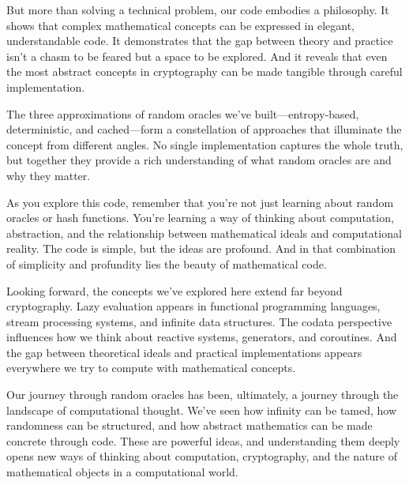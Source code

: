 \documentclass[11pt]{article}
\begin{document}
But more than solving a technical problem, our code embodies a philosophy. It shows that complex mathematical concepts can be expressed in elegant, understandable code. It demonstrates that the gap between theory and practice isn't a chasm to be feared but a space to be explored. And it reveals that even the most abstract concepts in cryptography can be made tangible through careful implementation.

The three approximations of random oracles we've built---entropy-based, deterministic, and cached---form a constellation of approaches that illuminate the concept from different angles. No single implementation captures the whole truth, but together they provide a rich understanding of what random oracles are and why they matter.

As you explore this code, remember that you're not just learning about random oracles or hash functions. You're learning a way of thinking about computation, abstraction, and the relationship between mathematical ideals and computational reality. The code is simple, but the ideas are profound. And in that combination of simplicity and profundity lies the beauty of mathematical code.

Looking forward, the concepts we've explored here extend far beyond cryptography. Lazy evaluation appears in functional programming languages, stream processing systems, and infinite data structures. The codata perspective influences how we think about reactive systems, generators, and coroutines. And the gap between theoretical ideals and practical implementations appears everywhere we try to compute with mathematical concepts.

Our journey through random oracles has been, ultimately, a journey through the landscape of computational thought. We've seen how infinity can be tamed, how randomness can be structured, and how abstract mathematics can be made concrete through code. These are powerful ideas, and understanding them deeply opens new ways of thinking about computation, cryptography, and the nature of mathematical objects in a computational world.



\end{document}
